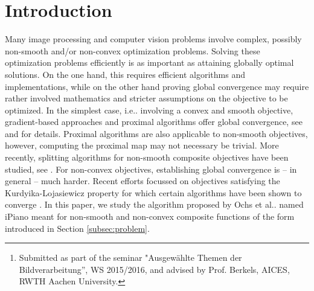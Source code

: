 \documentclass[onecolumn,final,a4paper,13pt,reqno]{siamart}
\title{{\TheTitle}}
\author{
  David Stutz\thanks{Submitted as part of the seminar "Ausgew\"ahlte Themen der Bildverarbeitung'', WS 2015/2016, and advised by Prof. Berkels, AICES, RWTH Aachen University.}
}
\makeatletter
\DeclareRobustCommand\onedot{\futurelet\@let@token\@onedot}
\def\@onedot{\ifx\@let@token.\else.\null\fi\xspace}
\def\ie{{i.e}\onedot} \def\Ie{{I.e}\onedot}
\def\etal{{et al}\onedot}
\makeatother
\begin{document}
\maketitle

\begin{abstract}
	This paper studies the minimization of non-convex and non-smooth composite functionsIn particular, we discuss the algorithm proposed by Ochs \etal in \cite{OchsChenBroxPock:2013}, called iPiano. Following \cite{OchsChenBroxPock:2013}, we present a global convergence result for functions satisfying the Kurdyka-Lojasiewicz property \cite{Lojasiewicz:1993,Kurdyka:1998} which is based on the work by Attouch \etal~\cite{AttouchBolteSvaiter:2013}. Furthermore, we discuss the implementation of iPiano and apply the algorithm to image denoising and image segmentation. In contrast to \cite{OchsChenBroxPock:2013}, we use simple denoising functionals instead of Fields of Expert \cite{RothBlack:2009,ChenPockRanftlBischof:2013} to demonstrate that simple functionals may benefit from non-smooth and non-convex terms. Finally, we demonstrate the applicability of the algorithm to image segmentation based on a 2-phase fields approximation of the Mumford-Shah functional \cite{Shen:2005}.
\end{abstract}

\section{Introduction}

Many image processing and computer vision problems involve complex, possibly non-smooth and/or non-convex optimization problems. Solving these optimization problems efficiently is as important as attaining globally optimal solutions. On the one hand, this requires efficient algorithms and implementations, while on the other hand proving global convergence may require rather involved mathematics and stricter assumptions on the objective to be optimized. In the simplest case, \ie involving a convex and smooth objective, gradient-based approaches and proximal algorithms offer global convergence, see \cite{BoydVandenberghe:2004} and \cite{ParikhBoyd:2014} for details. Proximal algorithms are also applicable to non-smooth objectives, however, computing the proximal map may not necessary be trivial. More recently, splitting algorithms for non-smooth composite objectives have been studied, see \cite{CombettesPesquet:2011}. For non-convex objectives, establishing global convergence is -- in general -- much harder. Recent efforts focussed on objectives satisfying the Kurdyika-Lojasiewicz property \cite{Lojasiewicz:1993,Kurdyka:1998} for which certain algorithms have been shown to converge \cite{AttouchBolteSvaiter:2013}. In this paper, we study the algorithm proposed by Ochs \etal \cite{OchsChenBroxPock:2013} named iPiano meant for non-smooth and non-convex composite functions of the form introduced in Section \ref{subsec:problem}.
\end{document}
